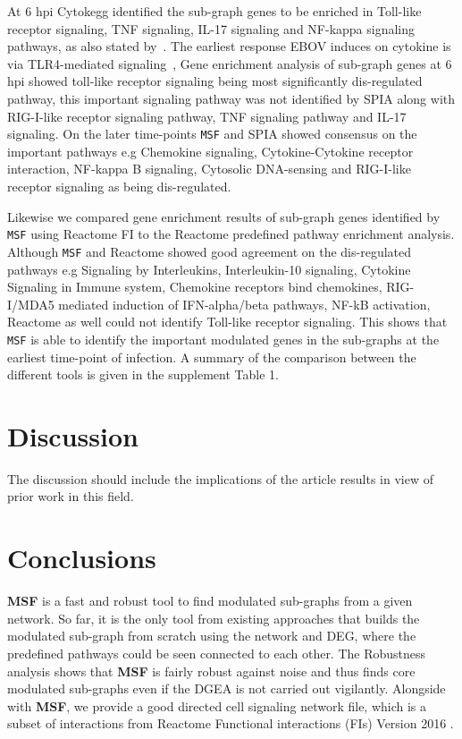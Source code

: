 \documentclass[10pt,a4paper,twocolumn]{article}
\begin{document}
At 6 hpi Cytokegg identified the sub-graph genes to be enriched in
Toll-like receptor signaling, TNF signaling, IL-17 signaling and
NF-kappa signaling pathways, as also stated by~\cite{Olejnik}. The
earliest response EBOV induces on cytokine is via TLR4-mediated
signaling~\cite{Olejnik}, Gene enrichment analysis of sub-graph genes
at 6 hpi showed toll-like receptor signaling being most significantly
dis-regulated pathway, this important signaling pathway was not
identified by SPIA along with RIG-I-like receptor signaling pathway,
TNF signaling pathway and IL-17 signaling. On the later time-points \texttt{MSF} and SPIA showed
consensus on the important pathways e.g Chemokine signaling,
Cytokine-Cytokine receptor interaction, NF-kappa B signaling,
Cytosolic DNA-sensing and RIG-I-like receptor signaling as being
dis-regulated.

Likewise we compared gene enrichment results of sub-graph genes
identified by \texttt{MSF} using Reactome FI to the Reactome
predefined pathway enrichment analysis. Although \texttt{MSF} and
Reactome showed good agreement on the dis-regulated pathways e.g
Signaling by Interleukins, Interleukin-10 signaling, Cytokine
Signaling in Immune system, Chemokine receptors bind chemokines,
RIG-I/MDA5 mediated induction of IFN-alpha/beta pathways, NF-kB
activation, Reactome as well could not identify Toll-like receptor
signaling. This shows that
\texttt{MSF} is able to identify the important modulated genes in the
sub-graphs at the earliest time-point of infection. A summary of the comparison between the different tools is given in the supplement Table 1.


\section*{Discussion}

The discussion should include the implications of the article results
in view of prior work in this field.

\section*{Conclusions}

\textbf{MSF} is a fast and robust tool to find modulated sub-graphs
from a given network. So far, it is the only tool from existing
approaches that builds the modulated sub-graph from scratch using the
network and DEG, where the predefined pathways could be seen connected
to each other. The Robustness analysis shows that \textbf{MSF} is
fairly robust against noise and thus finds core modulated sub-graphs
even if the DGEA is not carried out vigilantly. Alongside with
\textbf{MSF}, we provide a good directed cell signaling network file,
which is a subset of interactions from Reactome Functional
interactions (FIs) Version 2016 .
\end{document}
